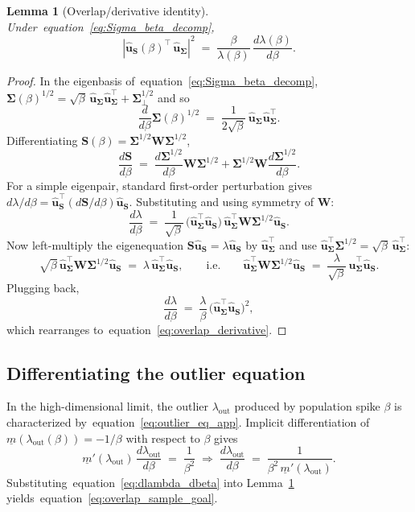 \documentclass{article}
\def\eqref#1{equation~\ref{#1}}
\def\vu{{\bm{u}}}
\def\mS{{\bm{S}}}
\def\mW{{\bm{W}}}
\def\mSigma{{\bm{\Sigma}}}
\newtheorem{lemma}{Lemma}
\begin{document}
\begin{lemma}[Overlap/derivative identity]\label{lem:overlap_derivative}
    Under~\eqref{eq:Sigma_beta_decomp},
    \begin{equation}\label{eq:overlap_derivative}
        |\hat\vu_\mS(\beta)^\top\,\hat\vu_\mSigma|^2
        \;=\; \frac{\beta}{\lambda(\beta)}\,\frac{d\lambda(\beta)}{d\beta}.
    \end{equation}
\end{lemma}
\begin{proof}
In the eigenbasis of~\eqref{eq:Sigma_beta_decomp}, $\mSigma(\beta)^{1/2}=\sqrt\beta\,\hat\vu_\mSigma\hat\vu_\mSigma^\top + \mSigma_\perp^{1/2}$ and so
\[
    \frac{d}{d\beta}\mSigma(\beta)^{1/2} \;=\; \frac{1}{2\sqrt\beta}\,\hat\vu_\mSigma\hat\vu_\mSigma^\top.
\]
Differentiating $\mS(\beta)=\mSigma^{1/2}\mW\mSigma^{1/2}$,
\[
    \frac{d\mS}{d\beta} \;=\; \frac{d\mSigma^{1/2}}{d\beta}\mW\mSigma^{1/2} + \mSigma^{1/2}\mW\frac{d\mSigma^{1/2}}{d\beta}.
\]
For a simple eigenpair, standard first-order perturbation gives $d\lambda/d\beta = \hat\vu_\mS^\top (d\mS/d\beta)\hat\vu_\mS$. Substituting and using symmetry of $\mW$:
\[
    \frac{d\lambda}{d\beta} \;=\; \frac{1}{\sqrt\beta}\,\big(\hat\vu_\mSigma^\top\hat\vu_\mS\big)\,\hat\vu_\mSigma^\top\mW\mSigma^{1/2}\hat\vu_\mS.
\]
Now left-multiply the eigenequation $\mS\hat\vu_\mS=\lambda\hat\vu_\mS$ by $\hat\vu_\mSigma^\top$ and use $\hat\vu_\mSigma^\top\mSigma^{1/2}=\sqrt\beta\,\hat\vu_\mSigma^\top$:
\[
    \sqrt\beta\,\hat\vu_\mSigma^\top\mW\mSigma^{1/2}\hat\vu_\mS \;=\; \lambda\,\hat\vu_\mSigma^\top\hat\vu_\mS,
    \qquad\text{i.e.}\qquad
    \hat\vu_\mSigma^\top\mW\mSigma^{1/2}\hat\vu_\mS \;=\; \frac{\lambda}{\sqrt\beta}\,\hat\vu_\mSigma^\top\hat\vu_\mS.
\]
Plugging back,
\[
    \frac{d\lambda}{d\beta} \;=\; \frac{\lambda}{\beta}\,\big(\hat\vu_\mSigma^\top\hat\vu_\mS\big)^2,
\]
which rearranges to~\eqref{eq:overlap_derivative}.
\end{proof}

\subsection{Differentiating the outlier equation}

In the high-dimensional limit, the outlier $\lambda_\mathrm{out}$ produced by population spike $\beta$ is characterized by~\eqref{eq:outlier_eq_app}. Implicit differentiation of $\underline{m}(\lambda_\mathrm{out}(\beta))=-1/\beta$ with respect to $\beta$ gives
\begin{equation}\label{eq:dlambda_dbeta}
    \underline{m}'(\lambda_\mathrm{out})\,\frac{d\lambda_\mathrm{out}}{d\beta} \;=\; \frac{1}{\beta^2}
    \;\Longrightarrow\;
    \frac{d\lambda_\mathrm{out}}{d\beta} \;=\; \frac{1}{\beta^2\,\underline{m}'(\lambda_\mathrm{out})}.
\end{equation}
Substituting~\eqref{eq:dlambda_dbeta} into Lemma~\ref{lem:overlap_derivative} yields~\eqref{eq:overlap_sample_goal}.
\end{document}
